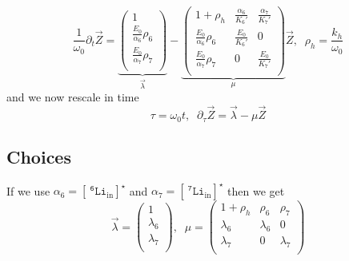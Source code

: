 \documentclass[aps,onecolumn,11pt]{revtex4}
\newcommand{\mychem}[1]{\mathtt{#1}}
\newcommand{\myconc}[1]{\left\lbrack{#1}\right\rbrack}
\newcommand{\spLi}[1]{{~^{\mychem{#1}}\mychem{Li}}}
\newcommand{\spLiIn}[1]{{\spLi{#1}}_{\mathrm{in}}}
\newcommand{\LiIn}[1]{\myconc{\spLiIn{#1}}}
\begin{document}
\begin{equation}
	\frac{1}{\omega_0}\partial_t \vec{Z} = 
	\underbrace{
	\begin{pmatrix}
	1\\
	\frac{E_0}{\alpha_6}\rho_6\\
	\frac{E_0}{\alpha_7}\rho_7\\
	\end{pmatrix}}_{\vec{\lambda}}
	-
	\underbrace{
	\begin{pmatrix}
	1+\rho_h & \frac{\alpha_6}{K_6'} & \frac{\alpha_7}{K_7'}\\
	\frac{E_0}{\alpha_6}\rho_6 & \frac{E_0}{K_6'} & 0 \\
	\frac{E_0}{\alpha_7}\rho_7 & 0      & \frac{E_0}{K_7'}\\
	\end{pmatrix}
	}_{\mu}
	\vec{Z}
	 ,\;\; \rho_h = \frac{k_h}{\omega_0}
\end{equation}
and we now rescale in time
\begin{equation}
\tau = \omega_0 t, \;\; \partial_\tau \vec{Z} = \vec{\lambda} - \mu \vec{Z}
\end{equation}

\subsection{Choices}
If we use $\alpha_6=\LiIn{6}^\star$ and $\alpha_7=\LiIn{7}^\star$ then we get
\begin{equation}
\vec{\lambda} =
\begin{pmatrix}
1\\
\lambda_6\\
\lambda_7\\
\end{pmatrix}
,\;\;
\mu=
\begin{pmatrix}
1+\rho_h & \rho_6 & \rho_7\\
\lambda_6 & \lambda_6 & 0 \\
\lambda_7 & 0 & \lambda_7\\
\end{pmatrix}
\end{equation}
\end{document}
